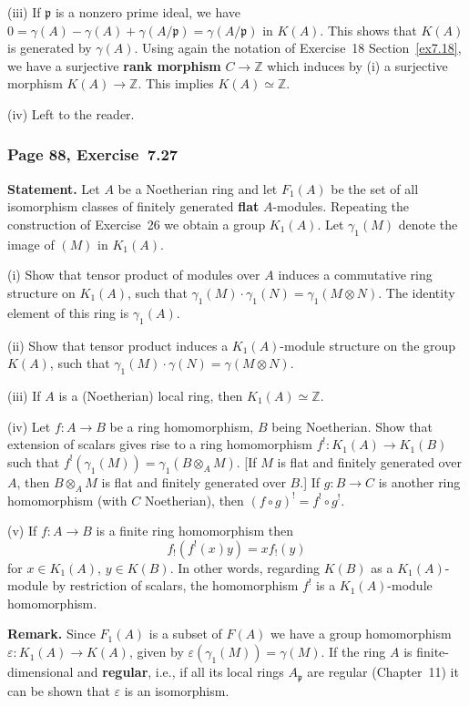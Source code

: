 \documentclass[12pt,letterpaper]{article}%
\newcommand{\mf}{\mathfrak}
\newcommand{\ppp}{\mf p}
\newcommand{\nn}{\noindent}
\newcommand{\Z}{\mathbb Z}
\begin{document}
\nn(iii) If $\ppp$ is a nonzero prime ideal, we have $0=\gamma(A)-\gamma(A)+\gamma(A/\ppp)=\gamma(A/\ppp)$ in $K(A)$. This shows that $K(A)$ is generated by $\gamma(A)$. Using again the notation of Exercise~18 Section~\ref{ex7.18}, we have a surjective \textbf{rank morphism} $C\to\Z$ which induces by (i) a surjective morphism $K(A)\to\Z$. This implies $K(A)\simeq\Z$.

\nn(iv) Left to the reader.

\subsubsection{Page 88, Exercise~7.27}%

\textbf{Statement.} Let $A$ be a Noetherian ring and let $F_1(A)$ be the set of all isomorphism classes of finitely generated \textbf{flat} $A$-modules. Repeating the construction of Exercise~26 we obtain a group $K_1(A)$. Let $\gamma_1(M)$ denote the image of $(M)$ in $K_1(A)$.

\nn(i) Show that tensor product of modules over $A$ induces a commutative ring structure on $K_1(A)$, such that $\gamma_1(M)\cdot\gamma_1(N)=\gamma_1(M\otimes N)$. The identity element of this ring is $\gamma_1(A)$.

\nn(ii) Show that tensor product induces a $K_1(A)$-module structure on the group $K(A)$, such that $\gamma_1(M)\cdot\gamma(N)=\gamma(M\otimes N)$.

\nn(iii) If $A$ is a (Noetherian) local ring, then $K_1 (A)\simeq\mathbb Z$.

\nn(iv) Let $f:A\to B$ be a ring homomorphism, $B$ being Noetherian. Show that extension of scalars gives rise to a ring homomorphism $f^!:K_1(A)\to K_1(B)$ such that $f^!(\gamma_1(M))=\gamma_1(B\otimes_AM)$. [If $M$ is flat and finitely generated over $A$, then $B\otimes_AM$ is flat and finitely generated over $B$.] If $g:B\to C$ is another ring homomorphism (with $C$ Noetherian), then $(f\circ g)^!=f^!\circ g^!$.

\nn(v) If $f:A\to B$ is a finite ring homomorphism then 
$$
f_!(f^!(x)y)=xf_!(y)
$$ 
for $x\in K_1(A)$, $y\in K(B)$. In other words, regarding $K(B)$ as a $K_1(A)$-module by restriction of scalars, the homomorphism $f^!$ is a $K_1(A)$-module homomorphism.

\textbf{Remark.} Since $F_1(A)$ is a subset of $F(A)$ we have a group homomorphism $\varepsilon:K_1(A)\to K(A)$, given by $\varepsilon(\gamma_1(M))=\gamma(M)$. If the ring $A$ is finite-dimensional and \textbf{regular}, i.e., if all its local rings $A_\ppp$ are regular (Chapter~11) it can be shown that $\varepsilon$ is an isomorphism.
\end{document}
